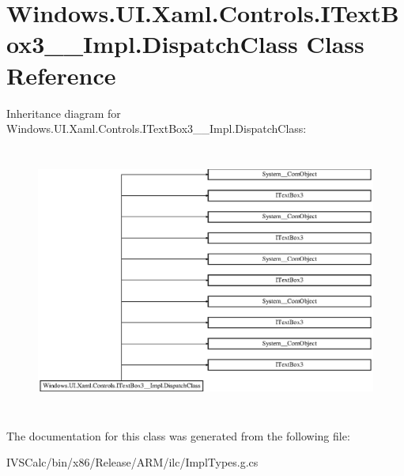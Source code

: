 \hypertarget{class_windows_1_1_u_i_1_1_xaml_1_1_controls_1_1_i_text_box3_____impl_1_1_dispatch_class}{}\section{Windows.\+U\+I.\+Xaml.\+Controls.\+I\+Text\+Box3\+\_\+\+\_\+\+Impl.\+Dispatch\+Class Class Reference}
\label{class_windows_1_1_u_i_1_1_xaml_1_1_controls_1_1_i_text_box3_____impl_1_1_dispatch_class}
Inheritance diagram for Windows.\+U\+I.\+Xaml.\+Controls.\+I\+Text\+Box3\+\_\+\+\_\+\+Impl.\+Dispatch\+Class\+:\begin{figure}[H]
\begin{center}
\leavevmode
\includegraphics[height=8.901734cm]{class_windows_1_1_u_i_1_1_xaml_1_1_controls_1_1_i_text_box3_____impl_1_1_dispatch_class}
\end{center}
\end{figure}


The documentation for this class was generated from the following file\+:\begin{DoxyCompactItemize}
\item 
I\+V\+S\+Calc/bin/x86/\+Release/\+A\+R\+M/ilc/Impl\+Types.\+g.\+cs\end{DoxyCompactItemize}
